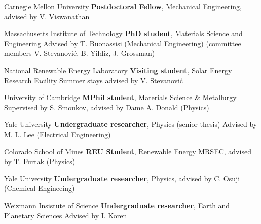 \vspace{-1mm}
	{Carnegie Mellon University}
	{\textbf{Postdoctoral Fellow}, Mechanical Engineering, advised by V. Viswanathan}
        {}

\vspace{-3mm}
	{Massachusetts Institute of Technology}
	{\textbf{PhD student}, Materials Science and Engineering}
    {Advised by T. Buonassisi (Mechanical Engineering) (committee members V. Stevanovi\'c, B. Yildiz, J. Grossman)}

\vspace{-3mm}
    {National Renewable Energy Laboratory}
    {\textbf{Visiting student}, Solar Energy Research Facility}
    {Summer stays advised by V. Stevanovi\'c}

\vspace{-3mm}
    {University of Cambridge}
    {\textbf{MPhil student}, Materials Science \& Metallurgy}
    {Supervised by S. Smoukov, advised by Dame A. Donald (Physics)}

\vspace{-3mm}
    {Yale University}
    {\textbf{Undergraduate researcher}, Physics (senior thesis)}
    {Advised by M. L. Lee (Electrical Engineering)}

\vspace{-3mm}
    {Colorado School of Mines}
    {\textbf{REU Student}, Renewable Energy MRSEC, advised by T. Furtak (Physics)}{}

\vspace{-3mm}
    {Yale University}
    {\textbf{Undergraduate researcher}, Physics, advised by C. Osuji (Chemical Engineeing)}
    {}

\vspace{-3mm}
    {Weizmann Insistute of Science}
    {\textbf{Undergraduate researcher}, Earth and Planetary Sciences}
    {Advised by I. Koren}

